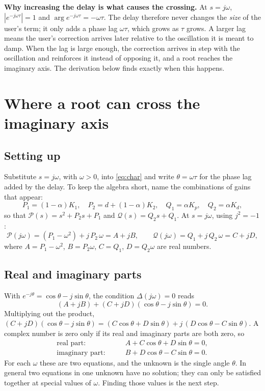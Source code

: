 \documentclass[11pt,a4paper]{article}
\theoremstyle{definition}
\begin{document}
\textbf{Why increasing the delay is what causes the crossing.} At
$s = j\omega$, $|e^{-j\omega\tau}| = 1$ and
$\arg e^{-j\omega\tau} = -\omega\tau$. The delay therefore never changes
the \emph{size} of the user's term; it only adds a phase lag
$\omega\tau$, which grows as $\tau$ grows. A larger lag means the user's
correction arrives later relative to the oscillation it is meant to
damp. When the lag is large enough, the correction arrives in step with
the oscillation and reinforces it instead of opposing it, and a root
reaches the imaginary axis. The derivation below finds exactly when this
happens.

\section{Where a root can cross the imaginary axis}
\label{sec:crossing}

\subsection{Setting up}
Substitute $s = j\omega$, with $\omega > 0$, into \eqref{eq:char} and
write $\theta = \omega\tau$ for the phase lag added by the delay. To keep
the algebra short, name the combinations of gains that appear:
\begin{equation}
P_1 = (1-\alpha)K_1,\quad P_2 = d + (1-\alpha)K_2,\quad
Q_1 = \alpha K_p,\quad Q_2 = \alpha K_d ,
\end{equation}
so that $\mathcal{P}(s) = s^2 + P_2 s + P_1$ and
$\mathcal{Q}(s) = Q_2 s + Q_1$. At $s = j\omega$, using $j^2 = -1$:
\begin{equation}
\mathcal{P}(j\omega) = (P_1 - \omega^{2}) + j\,P_2\,\omega = A + jB,
\qquad
\mathcal{Q}(j\omega) = Q_1 + j\,Q_2\,\omega = C + jD,
\end{equation}
where $A = P_1 - \omega^2$, $B = P_2\omega$, $C = Q_1$, $D = Q_2\omega$
are real numbers.

\subsection{Real and imaginary parts}
With $e^{-j\theta} = \cos\theta - j\sin\theta$, the condition
$\Delta(j\omega) = 0$ reads
\[
(A + jB) + (C + jD)(\cos\theta - j\sin\theta) = 0 .
\]
Multiplying out the product,
$(C + jD)(\cos\theta - j\sin\theta) = (C\cos\theta + D\sin\theta)
+ j\,(D\cos\theta - C\sin\theta)$. A complex number is zero only if its
real and imaginary parts are both zero, so
\begin{align}
\text{real part:}&\qquad A + C\cos\theta + D\sin\theta = 0, \label{eq:re}\\
\text{imaginary part:}&\qquad B + D\cos\theta - C\sin\theta = 0. \label{eq:im}
\end{align}
For each $\omega$ these are two equations, and the unknown is the single
angle $\theta$. In general two equations in one unknown have no
solution; they can only be satisfied together at special values of
$\omega$. Finding those values is the next step.
\end{document}
